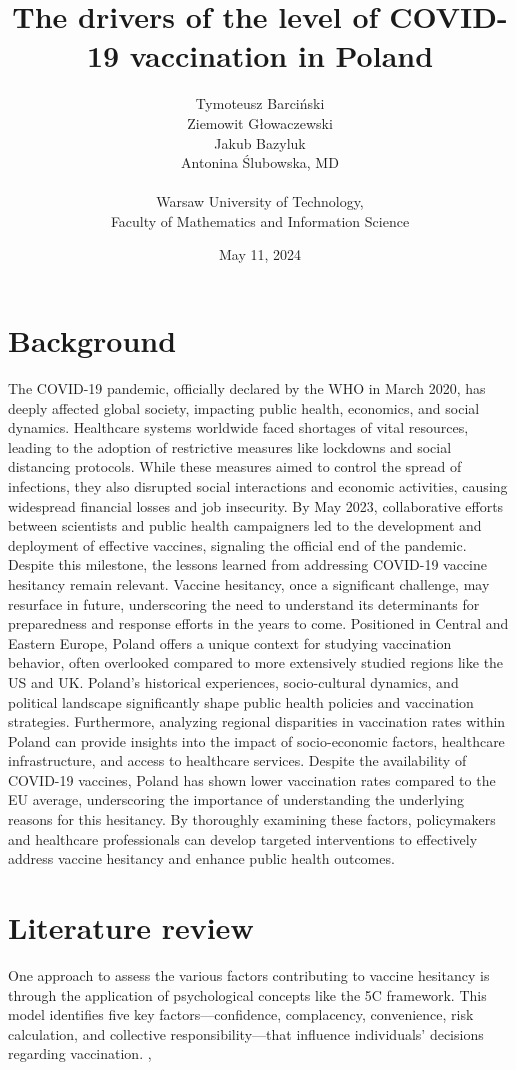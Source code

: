 \documentclass[a4paper,12pt]{article} %
\title{The drivers of the level of COVID-19 vaccination in Poland}
\date{May 11, 2024}
\author{
    Tymoteusz Barciński\\
    Ziemowit Głowaczewski\\
    Jakub Bazyluk\\
    Antonina Ślubowska, MD\\
    \\
    Warsaw University of Technology,\\
    Faculty of Mathematics and Information Science
}
\begin{document}

\maketitle

\section{Background}	
The COVID-19 pandemic, officially declared by the WHO in March 2020, has deeply affected global society, impacting public health, economics, and social dynamics. Healthcare systems worldwide faced shortages of vital resources, leading to the adoption of restrictive measures like lockdowns and social distancing protocols. While these measures aimed to control the spread of infections, they also disrupted social interactions and economic activities, causing widespread financial losses and job insecurity.
By May 2023, collaborative efforts between scientists and public health campaigners led to the development and deployment of effective vaccines, signaling the official end of the pandemic. Despite this milestone, the lessons learned from addressing COVID-19 vaccine hesitancy remain relevant. Vaccine hesitancy, once a significant challenge, may resurface in future, underscoring the need to understand its determinants for preparedness and response efforts in the years to come.
Positioned in Central and Eastern Europe, Poland offers a unique context for studying vaccination behavior, often overlooked compared to more extensively studied regions like the US and UK. Poland's historical experiences, socio-cultural dynamics, and political landscape significantly shape public health policies and vaccination strategies. Furthermore, analyzing regional disparities in vaccination rates within Poland can provide insights into the impact of socio-economic factors, healthcare infrastructure, and access to healthcare services. Despite the availability of COVID-19 vaccines, Poland has shown lower vaccination rates compared to the EU average, underscoring the importance of understanding the underlying reasons for this hesitancy. \cite{covid_vaccine_tracker}
By thoroughly examining these factors, policymakers and healthcare professionals can develop targeted interventions to effectively address vaccine hesitancy and enhance public health outcomes.

\section{Literature review}
One approach to assess the various factors contributing to vaccine hesitancy is through the application of psychological concepts like the 5C framework. This model identifies five key factors—confidence, complacency, convenience, risk calculation, and collective responsibility—that influence individuals' decisions regarding vaccination. \cite{10.1371/journal.pone.0208601}, \cite{Machingaidze2021}
\end{document}
